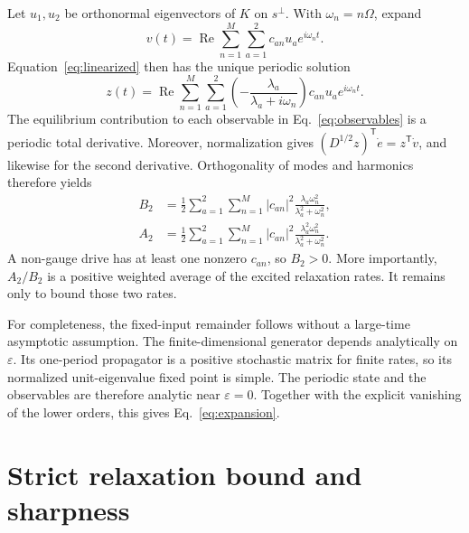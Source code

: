 \documentclass[11pt,a4paper]{article}
\newcommand{\eps}{\varepsilon}
\begin{document}
Let $u_1,u_2$ be orthonormal eigenvectors of $K$ on $s^\perp$. With
$\omega_n=n\Omega$, expand
\begin{equation}
 v(t)=\operatorname{Re}\sum_{n=1}^M\sum_{a=1}^2
 c_{an}u_a e^{i\omega_nt}.
\end{equation}
Equation~\eqref{eq:linearized} then has the unique periodic solution
\begin{equation}
 z(t)=\operatorname{Re}\sum_{n=1}^M\sum_{a=1}^2
 \left(-\frac{\lambda_a}{\lambda_a+i\omega_n}\right)
 c_{an}u_a e^{i\omega_nt}.
 \label{eq:zsolution}
\end{equation}
The equilibrium contribution to each observable in Eq.~\eqref{eq:observables} is a
periodic total derivative. Moreover, normalization gives
$(D^{1/2}z)^{\mathsf T}\dot e=z^{\mathsf T}\dot v$, and likewise for the second
derivative. Orthogonality of modes and harmonics therefore yields
\begin{align}
 B_2&=\frac12\sum_{a=1}^2\sum_{n=1}^M |c_{an}|^2
 \frac{\lambda_a\omega_n^2}{\lambda_a^2+\omega_n^2},
 \label{eq:B2}\\
 A_2&=\frac12\sum_{a=1}^2\sum_{n=1}^M |c_{an}|^2
 \frac{\lambda_a^2\omega_n^2}{\lambda_a^2+\omega_n^2}.
 \label{eq:A2}
\end{align}
A non-gauge drive has at least one nonzero $c_{an}$, so $B_2>0$. More importantly,
$A_2/B_2$ is a positive weighted average of the excited relaxation rates. It remains
only to bound those two rates.

For completeness, the fixed-input remainder follows without a large-time asymptotic
assumption. The finite-dimensional generator depends analytically on $\eps$. Its
one-period propagator is a positive stochastic matrix for finite rates, so its normalized
unit-eigenvalue fixed point is simple. The periodic state and the observables are
therefore analytic near $\eps=0$. Together with the explicit vanishing of the lower
orders, this gives Eq.~\eqref{eq:expansion}.

\section{Strict relaxation bound and sharpness}
\label{sec:spectral}
\end{document}
